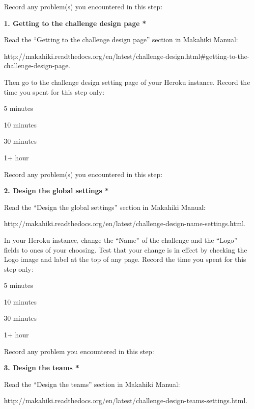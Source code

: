Record any problem(s) you encountered in this step: \underline{\hspace{4cm}}

{\bf 1. Getting to the challenge design page *}

Read the ``Getting to the challenge design page'' section in Makahiki Manual:

http://makahiki.readthedocs.org/en/latest/challenge-design.html\#getting-to-the-challenge-design-page. 

Then go to the challenge design setting page of your Heroku instance. Record the time you spent for this step only:

\begin{radiobutton}
\item 5 minutes
\item  10 minutes
\item  30 minutes
\item  1+ hour
\end{radiobutton}

Record any problem(s) you encountered in this step: \underline{\hspace{4cm}}

{\bf 2. Design the global settings *}

Read the ``Design the global settings'' section in Makahiki Manual:

http://makahiki.readthedocs.org/en/latest/challenge-design-name-settings.html. 

In your Heroku instance, change the ``Name'' of the challenge and the ``Logo'' fields to ones of your choosing. Test that your change is in effect by checking the Logo image and label at the top of any page. Record the time you spent for this step only:

\begin{radiobutton}
\item 5 minutes
\item  10 minutes
\item  30 minutes
\item  1+ hour
\end{radiobutton}


Record any problem you encountered in this step: \underline{\hspace{4cm}}

{\bf 3. Design the teams *}

Read the ``Design the teams'' section in Makahiki Manual:

http://makahiki.readthedocs.org/en/latest/challenge-design-teams-settings.html. 


